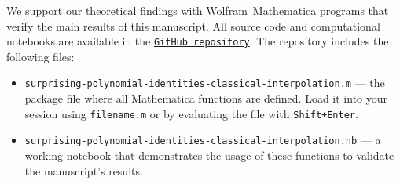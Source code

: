 We support our theoretical findings with Wolfram~Mathematica programs that verify the main results of this manuscript.
All source code and computational notebooks are available in the
\href{https://github.com/kolosovpetro/surprising-polynomial-identities-classical-interpolation}
{\texttt{GitHub repository}}.
The repository includes the following files:
\begin{itemize}
    \item \texttt{surprising-polynomial-identities-classical-interpolation.m} --- the package file where
    all Mathematica functions are defined.
    Load it into your session using \texttt{filename.m} or by evaluating the file with \texttt{Shift+Enter}.
    \item \texttt{surprising-polynomial-identities-classical-interpolation.nb} --- a working notebook that demonstrates
    the usage of these functions to validate the manuscript’s results.
\end{itemize}

